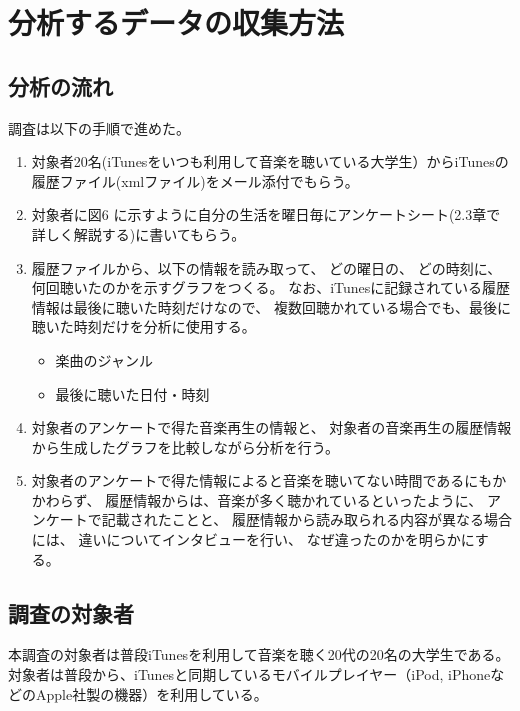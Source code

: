 \documentclass[a4paper, 11pt, onecolumn, report]{jsarticle}
\begin{document}
\section{分析するデータの収集方法}
\subsection{分析の流れ}
調査は以下の手順で進めた。

\begin{enumerate}
\item
対象者20名(iTunesをいつも利用して音楽を聴いている大学生）からiTunesの履歴ファイル(xmlファイル)をメール添付でもらう。
\item
対象者に図6%
に示すように自分の生活を曜日毎にアンケートシート(2.3章で詳しく解説する)に書いてもらう。
\item
履歴ファイルから、以下の情報を読み取って、
どの曜日の、
どの時刻に、
何回聴いたのかを示すグラフをつくる。
なお、iTunesに記録されている履歴情報は最後に聴いた時刻だけなので、
複数回聴かれている場合でも、最後に聴いた時刻だけを分析に使用する。
\begin{itemize}
\item
楽曲のジャンル
\item
最後に聴いた日付・時刻
\end{itemize}


\item
対象者のアンケートで得た音楽再生の情報と、
対象者の音楽再生の履歴情報から生成したグラフを比較しながら分析を行う。
\item
対象者のアンケートで得た情報によると音楽を聴いてない時間であるにもかかわらず、
履歴情報からは、音楽が多く聴かれているといったように、
アンケートで記載されたことと、
履歴情報から読み取られる内容が異なる場合には、
違いについてインタビューを行い、
なぜ違ったのかを明らかにする。
\end{enumerate}

\subsection{調査の対象者}
本調査の対象者は普段iTunesを利用して音楽を聴く20代の20名の大学生である。
対象者は普段から、iTunesと同期しているモバイルプレイヤー（iPod, iPhoneなどのApple社製の機器）を利用している。
\end{document}
